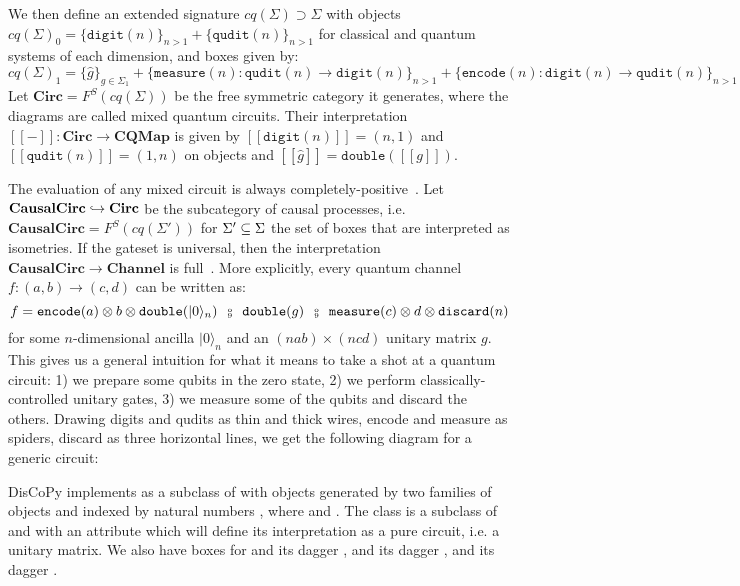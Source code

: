 We then define an extended signature $cq(\Sigma) \supset \Sigma$ with objects $cq(\Sigma)_0 = \{ \mathtt{digit}(n) \}_{n > 1} + \{ \mathtt{qudit}(n) \}_{n > 1}$ for classical and quantum systems of each dimension, and boxes given by:
$$cq(\Sigma)_1 = \{ \hat{g} \}_{g \in \Sigma_1}
+ \{ \mathtt{measure}(n) : \mathtt{qudit}(n) \to \mathtt{digit}(n) \}_{n > 1}
+ \{ \mathtt{encode}(n) : \mathtt{digit}(n) \to \mathtt{qudit}(n) \}_{n > 1}$$
Let $\mathbf{Circ} = F^S(cq(\Sigma))$ be the free symmetric category it generates, where the diagrams are called mixed quantum circuits.
Their interpretation $[\![-]\!] : \mathbf{Circ} \to \mathbf{CQMap}$ is given by
$[\![\mathtt{digit}(n)]\!] = (n, 1)$ and $[\![\mathtt{qudit}(n)]\!] = (1, n)$ on objects and
$[\![\hat{g}]\!] = \mathtt{double}([\![g]\!])$.

The evaluation of any mixed circuit is always completely-positive~\cite[Corollary~8.6]{CoeckeKissinger17}.
Let $\mathbf{CausalCirc} \hookrightarrow \mathbf{Circ}$ be the subcategory of causal processes, i.e. $\mathbf{CausalCirc} = F^S(cq(\Sigma'))$ for $\Sigma' \subseteq \Sigma$ the set of boxes that are interpreted as isometries.
If the gateset is universal, then the interpretation $\mathbf{CausalCirc} \to \mathbf{Channel}$ is full~\cite[Theorem~8.96]{CoeckeKissinger17}.
More explicitly, every quantum channel $f : (a, b) \to (c, d)$ can be written as:
$$f = \mathtt{encode}(a) \otimes b \otimes \mathtt{double}(\vert 0 \rangle_n)
\s \fcmp \s \mathtt{double}(g) \s \fcmp \s
\mathtt{measure}(c) \otimes d \otimes \mathtt{discard}(n)$$
for some $n$-dimensional ancilla $\vert 0 \rangle_n$ and an $(n a b) \times (n c d)$ unitary matrix $g$.
This gives us a general intuition for what it means to take a shot at a quantum circuit: 1) we prepare some qubits in the zero state, 2) we perform classically-controlled unitary gates, 3) we measure some of the qubits and discard the others.
Drawing digits and qudits as thin and thick wires, encode and measure as spiders, discard as three horizontal lines, we get the following diagram for a generic circuit:

DisCoPy implements  as a subclass of  with objects generated by two families of objects  and  indexed by natural numbers , where  and .
The class  is a subclass of  and  with an attribute  which will define its interpretation as a pure circuit, i.e. a unitary matrix.
We also have boxes for  and its dagger ,  and its dagger ,  and its dagger .

